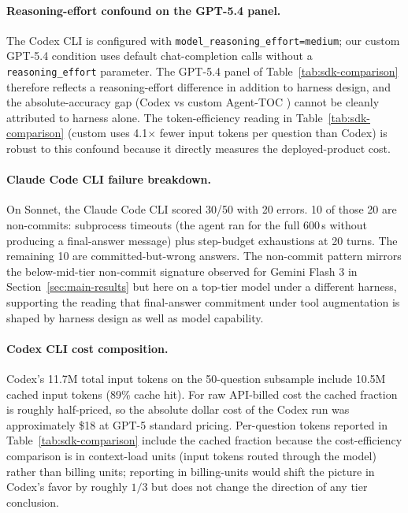 \documentclass{article}
\begin{document}
\paragraph{Reasoning-effort confound on the GPT-5.4 panel.}
The Codex CLI is configured with \texttt{model\_reasoning\_effort=medium}; our custom GPT-5.4 condition uses default chat-completion calls without a \texttt{reasoning\_effort} parameter. The GPT-5.4 panel of Table~\ref{tab:sdk-comparison} therefore reflects a reasoning-effort difference in addition to harness design, and the absolute-accuracy gap (Codex \CodexGPTFiveFourAcc{} vs custom Agent-TOC \GPTFiveFourCustomTOCMatchedAcc{}) cannot be cleanly attributed to harness alone. The token-efficiency reading in Table~\ref{tab:sdk-comparison} (custom uses 4.1$\times$ fewer input tokens per question than Codex) is robust to this confound because it directly measures the deployed-product cost.

\paragraph{Claude Code CLI failure breakdown.}
On Sonnet, the Claude Code CLI scored 30/50 with 20 errors. 10 of those 20 are non-commits: \SDKSonnetTimeouts{} subprocess timeouts (the agent ran for the full 600\,s without producing a final-answer message) plus \SDKSonnetMaxTurns{} step-budget exhaustions at 20 turns. The remaining 10 are committed-but-wrong answers. The non-commit pattern mirrors the below-mid-tier non-commit signature observed for Gemini Flash 3 in Section~\ref{sec:main-results} but here on a top-tier model under a different harness, supporting the reading that final-answer commitment under tool augmentation is shaped by harness design as well as model capability.

\paragraph{Codex CLI cost composition.}
Codex's 11.7M total input tokens on the 50-question subsample include 10.5M cached input tokens (89\% cache hit). For raw API-billed cost the cached fraction is roughly half-priced, so the absolute dollar cost of the Codex run was approximately \$18 at GPT-5 standard pricing. Per-question tokens reported in Table~\ref{tab:sdk-comparison} include the cached fraction because the cost-efficiency comparison is in context-load units (input tokens routed through the model) rather than billing units; reporting in billing-units would shift the picture in Codex's favor by roughly $1/3$ but does not change the direction of any tier conclusion.
\end{document}
